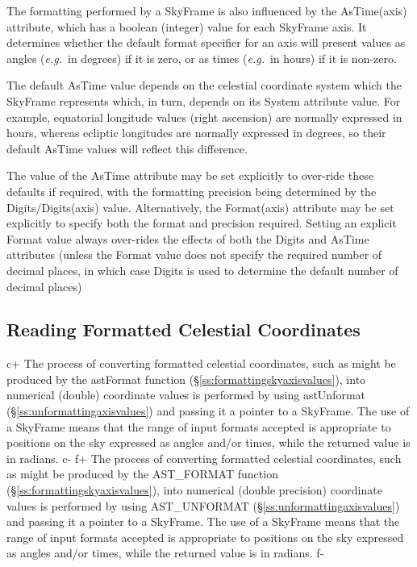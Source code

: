 \documentclass[twoside,11pt]{article}
\newcommand{\secref}[1]{\S\ref{#1}}
\newcommand{\secref}[1]{\ref{#1}}
\begin{document}
The formatting performed by a SkyFrame is also influenced by the
AsTime(axis) attribute, which has a boolean (integer) value for each
SkyFrame axis.  It determines whether the default format specifier for
an axis will present values as angles ({\em{e.g.}}\ in degrees) if it
is zero, or as times ({\em{e.g.}}\ in hours) if it is non-zero.

The default AsTime value depends on the celestial coordinate system
which the SkyFrame represents which, in turn, depends on its System
attribute value. For example, equatorial longitude values (right
ascension) are normally expressed in hours, whereas ecliptic
longitudes are normally expressed in degrees, so their default AsTime
values will reflect this difference.

The value of the AsTime attribute may be set explicitly to over-ride
these defaults if required, with the formatting precision being
determined by the Digits/Digits(axis) value. Alternatively, the
Format(axis) attribute may be set explicitly to specify both the
format and precision required. Setting an explicit Format value always
over-rides the effects of both the Digits and AsTime attributes (unless
the Format value does not specify the required number of decimal places,
in which case Digits is used to determine the default number of decimal
places)

\subsection{\label{ss:unformattingskyaxisvalues}Reading Formatted Celestial Coordinates}

c+
The process of converting formatted celestial coordinates, such as
might be produced by the astFormat function
(\secref{ss:formattingskyaxisvalues}), into numerical (double)
coordinate values is performed by using astUnformat
(\secref{ss:unformattingaxisvalues}) and passing it a pointer to a
SkyFrame. The use of a SkyFrame means that the range of input formats
accepted is appropriate to positions on the sky expressed as angles
and/or times, while the returned value is in radians.
c-
f+
The process of converting formatted celestial coordinates, such as
might be produced by the AST\_FORMAT function
(\secref{ss:formattingskyaxisvalues}), into numerical (double
precision) coordinate values is performed by using AST\_UNFORMAT
(\secref{ss:unformattingaxisvalues}) and passing it a pointer to a
SkyFrame. The use of a SkyFrame means that the range of input formats
accepted is appropriate to positions on the sky expressed as angles
and/or times, while the returned value is in radians.
f-
\end{document}
